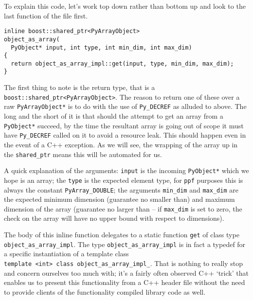 To explain this code, let's work top down rather than bottom up and
look to the last function of the file first.
\begin{verbatim}
inline boost::shared_ptr<PyArrayObject>
object_as_array(
  PyObject* input, int type, int min_dim, int max_dim)
{
  return object_as_array_impl::get(input, type, min_dim, max_dim);
}
\end{verbatim}
The first thing to note is the return type, that is a \\
\verb|boost::shared_ptr<PyArrayObject>|. The reason to return one of
these over a raw \verb|PyArrayObject*| is to do with the use of
\verb|Py_DECREF| as alluded to above. The long and the short of it is
that should the attempt to get an array from a \verb|PyObject*|
succeed, by the time the resultant array is going out of scope it must
have \verb|Py_DECREF| called on it to avoid a resource leak. This
should happen even in the event of a C++ exception. As we will see,
the wrapping of the array up in the \verb|shared_ptr| means this will
be automated for us.

A quick explanation of the arguments: \verb|input| is the incoming
\verb|PyObject*| which we hope is an array; the \verb|type| is the
expected element type, for \verb|ppf| purposes this is always the
constant \verb|PyArray_DOUBLE|; the arguments \verb|min_dim| and
\verb|max_dim| are the expected minimum dimension (guarantee no smaller than) and maximum
dimension of the array (guarantee no larger than -- if \verb|max_dim|
is set to zero, the check on the array will have no upper bound with
respect to dimensions).

The body of this inline function delegates to a static function
\verb|get| of class type \verb|object_as_array_impl|. The type
\verb|object_as_array_impl| is
in fact a typedef for a specific instantiation of a template class\\
\verb|template <int> class object_as_array_impl_|. That is nothing to
really stop and concern ourselves too much with; it's a fairly often 
observed C++ `trick' that enables us to present this functionality from
a C++ header file without the need to provide clients of the
functionality compiled library code as well.

